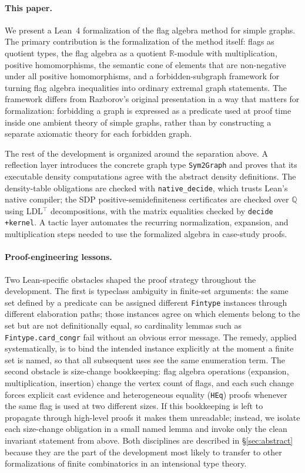 \documentclass{article}
\newcommand{\lean}[1]{\texttt{#1}}
\begin{document}
\paragraph{This paper.}
We present a Lean~4 formalization of the flag algebra method for simple
graphs.  The primary contribution is the formalization of the method itself:
flags as quotient types, the flag algebra as a quotient $\mathbb{R}$-module
with multiplication, positive homomorphisms, the semantic cone of elements
that are non-negative under all positive homomorphisms, and a
forbidden-subgraph framework for turning flag algebra inequalities into
ordinary extremal graph statements.  The framework differs from Razborov's
original presentation in a way that matters for formalization: forbidding a
graph is expressed as a predicate used at proof time inside one ambient theory
of simple graphs, rather than by constructing a separate axiomatic theory for
each forbidden graph.

The rest of the development is organized around the separation above.  A
reflection layer introduces the concrete graph type \lean{Sym2Graph} and proves
that its executable density computations agree with the abstract density
definitions.  The density-table obligations are checked with
\lean{native\_decide}, which trusts Lean's native compiler; the SDP
positive-semidefiniteness certificates are checked over $\mathbb{Q}$ using
LDL$^\top$ decompositions, with the matrix equalities checked by
\lean{decide +kernel}.  A tactic layer automates the recurring normalization,
expansion, and multiplication steps needed to use the formalized algebra in
case-study proofs.

\paragraph{Proof-engineering lessons.}
Two Lean-specific obstacles shaped the proof strategy throughout the
development.  The first is typeclass ambiguity in finite-set arguments: the
same set defined by a predicate can be assigned different \lean{Fintype}
instances through different elaboration paths; those instances agree on which
elements belong to the set but are not definitionally equal, so cardinality
lemmas such as \lean{Fintype.card\_congr} fail without an obvious error
message.  The remedy, applied systematically, is to bind the intended instance
explicitly at the moment a finite set is named, so that all subsequent uses
see the same enumeration term.  The second obstacle is size-change bookkeeping:
flag algebra operations (expansion, multiplication, insertion) change the
vertex count of flags, and each such change forces explicit cast evidence and
heterogeneous equality (\lean{HEq}) proofs whenever the same flag is used at
two different sizes.  If this bookkeeping is left to propagate through
high-level proofs it makes them unreadable; instead, we isolate each
size-change obligation in a small named lemma and invoke only the clean
invariant statement from above.  Both disciplines are described in
\S\ref{sec:abstract} because they are the part of the development most likely
to transfer to other formalizations of finite combinatorics in an intensional
type theory.
\end{document}
